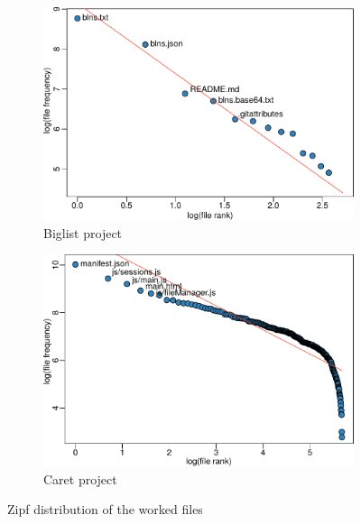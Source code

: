 \begin{figure}[t]
	\begin{subfigure}{.5\textwidth}
		\centering
		\includegraphics[width=\linewidth]{bpm2017/figures/biglist-new-crop}
		\caption{Biglist project}
		\label{fig:biglist}
	\end{subfigure}%
	\begin{subfigure}{.5\textwidth}
		\centering
		\includegraphics[width=\linewidth]{bpm2017/figures/caret-new-crop}
		\caption{Caret project}
		\label{fig:caret}
	\end{subfigure}
	\caption{Zipf distribution of the worked files}
	\label{fig:zipf-graph}
\end{figure}
